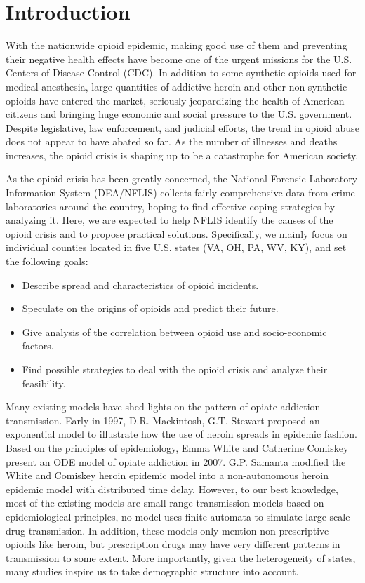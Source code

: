 \documentclass[a4paper]{article}
\begin{document}

\section{Introduction} 

With the nationwide opioid epidemic, making good use of them and preventing their negative health effects have become one of the urgent missions for the U.S. Centers of Disease Control (CDC). \cite{CDC} In addition to some synthetic opioids used for medical anesthesia, large quantities of addictive heroin and other non-synthetic opioids have entered the market, seriously jeopardizing the health of American citizens and bringing huge economic and social pressure to the U.S. government. \cite{opioidrelation} Despite legislative, law enforcement, and judicial efforts, the trend in opioid abuse does not appear to have abated so far. \cite{law2018, DEA2018} As the number of illnesses and deaths increases, the opioid crisis is shaping up to be a catastrophe for American society. \cite{opioidcrsis}

As the opioid crisis has been greatly concerned, the National Forensic Laboratory Information System (DEA/NFLIS) collects fairly comprehensive data from crime laboratories around the country, hoping to find effective coping strategies by analyzing it. Here, we are expected to help NFLIS identify the causes of the opioid crisis and to propose practical solutions. Specifically, we mainly focus on individual counties located in five U.S. states (VA, OH, PA, WV, KY), and set the following goals:

\begin{itemize} 
\item Describe spread and characteristics of opioid incidents.
\item Speculate on the origins of opioids and predict their future.
\item Give analysis of the correlation between opioid use and socio-economic factors.
\item Find possible strategies to deal with the opioid crisis and analyze their feasibility.
\end{itemize}

Many existing models have shed lights on the pattern of opiate addiction transmission. Early in 1997, D.R. Mackintosh, G.T. Stewart proposed an exponential model to illustrate how the use of heroin spreads in epidemic fashion.\cite{model1979} Based on the principles of epidemiology, Emma White and Catherine Comiskey present an ODE model of opiate addiction in 2007.\cite{model2007} G.P. Samanta modified the White and Comiskey heroin epidemic model into a non-autonomous heroin epidemic model with distributed time delay.\cite{model2011} However, to our best knowledge, most of the existing models are small-range transmission models based on epidemiological principles, no model uses finite automata to simulate large-scale drug transmission. In addition, these models only mention non-prescriptive opioids like heroin, but prescription drugs may have very different patterns in transmission to some extent. More importantly, given the heterogeneity of states, many studies inspire us to take demographic structure into account. \cite{hetro, demogen2001}
\end{document}
